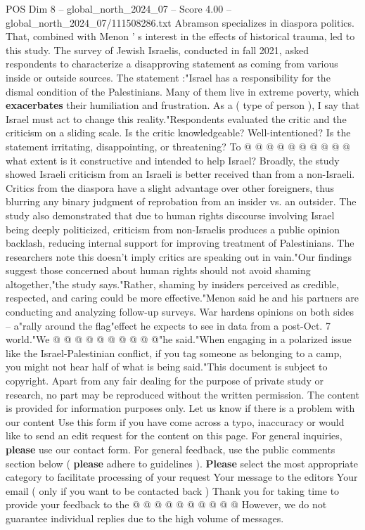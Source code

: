 \begin{textsample}{POS Dim 8 – global\_north\_2024\_07 – Score 4.00 – global\_north\_2024\_07/111508286.txt}
Abramson specializes in diaspora politics.
That, combined with Menon ' s interest in the effects of historical trauma, led to this study.
The survey of Jewish Israelis, conducted in fall 2021, asked respondents to characterize a disapproving statement as coming from various inside or outside sources.
The statement :"Israel has a responsibility for the dismal condition of the Palestinians.
Many of them live in extreme poverty, which \textbf{exacerbates} their humiliation and frustration.
As a ( type of person ), I say that Israel must act to change this reality."Respondents evaluated the critic and the criticism on a sliding scale.
Is the critic knowledgeable?
Well-intentioned?
Is the statement irritating, disappointing, or threatening?
To @ @ @ @ @ @ @ @ @ @ what extent is it constructive and intended to help Israel?
Broadly, the study showed Israeli criticism from an Israeli is better received than from a non-Israeli.
Critics from the diaspora have a slight advantage over other foreigners, thus blurring any binary judgment of reprobation from an insider vs. an outsider.
The study also demonstrated that due to human rights discourse involving Israel being deeply politicized, criticism from non-Israelis produces a public opinion backlash, reducing internal support for improving treatment of Palestinians.
The researchers note this doesn't imply critics are speaking out in vain."Our findings suggest those concerned about human rights should not avoid shaming altogether,"the study says."Rather, shaming by insiders perceived as credible, respected, and caring could be more effective."Menon said he and his partners are conducting and analyzing follow-up surveys.
War hardens opinions on both sides -- a"rally around the flag"effect he expects to see in data from a post-Oct. 7 world."We @ @ @ @ @ @ @ @ @ @"he said."When engaging in a polarized issue like the Israel-Palestinian conflict, if you tag someone as belonging to a camp, you might not hear half of what is being said."This document is subject to copyright.
Apart from any fair dealing for the purpose of private study or research, no part may be reproduced without the written permission.
The content is provided for information purposes only.
Let us know if there is a problem with our content Use this form if you have come across a typo, inaccuracy or would like to send an edit request for the content on this page.
For general inquiries, \textbf{please} use our contact form.
For general feedback, use the public comments section below ( \textbf{please} adhere to guidelines ). \textbf{Please} select the most appropriate category to facilitate processing of your request Your message to the editors Your email ( only if you want to be contacted back ) Thank you for taking time to provide your feedback to the @ @ @ @ @ @ @ @ @ @ However, we do not guarantee individual replies due to the high volume of messages.

\end{textsample}
